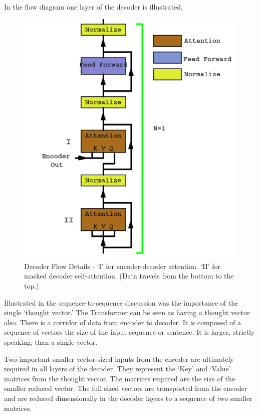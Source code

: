 In the flow diagram one layer of the decoder is illustrated.

\begin{figure}[H]
	\begin{center}
		
		
		\includegraphics[scale=1.25]{diagram-flow-decoder02}
	\end{center}
	\caption[Decoder Flow]{Decoder Flow Details - `I' for encoder-decoder attention. `II' for masked decoder self-attention. (Data travels from the bottom to the top.)}
	
	
\end{figure}


Illustrated in the sequence-to-sequence discussion was the importance of the single `thought vector.' The Transformer can be seen as having a thought vector also. There is a corridor of data from encoder to decoder. It is composed of a sequence of vectors the size of the input sequence or sentence. It is larger, strictly speaking, than a single vector.

Two important smaller vector-sized inputs from the encoder are ultimately required in all layers of the decoder. They represent the `Key' and `Value' matrices from the thought vector. The matrices required are the size of the smaller reduced vector. The full sized vectors are transported from the encoder and are reduced dimensionally in the decoder layers to a sequence of two smaller matrices. 

